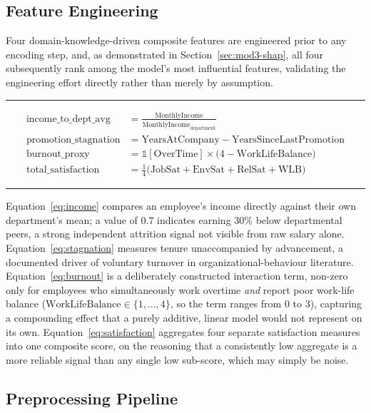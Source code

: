 \documentclass[11pt,a4paper]{article}
\newenvironment{formulabox}
  {\begin{center}\color{TPteal}\rule{0.92\linewidth}{0.8pt}\par\vspace{5pt}\color{TPnavy}}
  {\par\vspace{3pt}\color{TPteal}\rule{0.92\linewidth}{0.8pt}\end{center}}
\begin{document}
\subsection{Feature Engineering}
\label{sec:mod3-features}

Four domain-knowledge-driven composite features are engineered prior to any encoding step, and, as demonstrated in Section~\ref{sec:mod3-shap}, all four subsequently rank among the model's most influential features, validating the engineering effort directly rather than merely by assumption.

\begin{formulabox}
\begin{align}
\label{eq:income}
\text{income\_to\_dept\_avg} &= \frac{\text{MonthlyIncome}}{\overline{\text{MonthlyIncome}}_{\text{department}}} \\[2pt]
\label{eq:stagnation}
\text{promotion\_stagnation} &= \text{YearsAtCompany} - \text{YearsSinceLastPromotion} \\[2pt]
\label{eq:burnout}
\text{burnout\_proxy} &= \mathbb{1}[\text{OverTime}] \times \big(4 - \text{WorkLifeBalance}\big) \\[2pt]
\label{eq:satisfaction}
\text{total\_satisfaction} &= \tfrac{1}{4}\big(\text{JobSat} + \text{EnvSat} + \text{RelSat} + \text{WLB}\big)
\end{align}
\end{formulabox}

Equation~\ref{eq:income} compares an employee's income directly against their own department's mean; a value of $0.7$ indicates earning 30\% below departmental peers, a strong independent attrition signal not visible from raw salary alone. Equation~\ref{eq:stagnation} measures tenure unaccompanied by advancement, a documented driver of voluntary turnover in organizational-behaviour literature. Equation~\ref{eq:burnout} is a deliberately constructed interaction term, non-zero only for employees who simultaneously work overtime \emph{and} report poor work-life balance ($\mathrm{WorkLifeBalance} \in \{1,\ldots,4\}$, so the term ranges from 0 to 3), capturing a compounding effect that a purely additive, linear model would not represent on its own. Equation~\ref{eq:satisfaction} aggregates four separate satisfaction measures into one composite score, on the reasoning that a consistently low aggregate is a more reliable signal than any single low sub-score, which may simply be noise.

\subsection{Preprocessing Pipeline}
\end{document}
